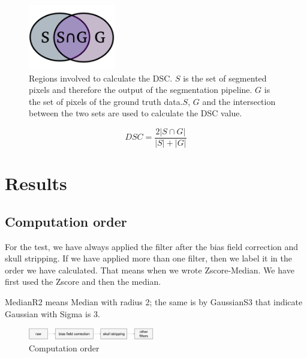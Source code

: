 \documentclass[journal]{IEEEtran}
\begin{document}
\begin{figure}[!t]
\centering
\includegraphics[width=1.5in]{img/dice}
\caption{Regions involved to calculate the DSC. $S$ is the set of segmented pixels and therefore the output of the segmentation pipeline. $G$ is the set of pixels of the ground truth data.$S$, $G$ and the intersection between the two sets are used to calculate the DSC value.}
\label{fig:dice}
\end{figure}

\begin{equation}
    \label{eq:DSC}
    DSC = \frac{2\left |S\cap G  \right |}{\left |S  \right | + \left |G  \right |}
\end{equation}

\section{Results}

\subsection{Computation order}

For the test, we have always applied the filter after the bias field correction and skull stripping.
If we have applied more than one filter, then we label it in the order we have calculated. That means when we wrote Zscore-Median. We have first used the Zscore and then the median.

MedianR2 means Median with radius 2; the same is by GaussianS3 that indicate Gaussian with Sigma is 3.

\begin{figure}[!h]
\centering
\includegraphics[width=0.49\textwidth]{png/preprocessing-pipeline.png}
\caption{Computation order}
\end{figure}
\end{document}
